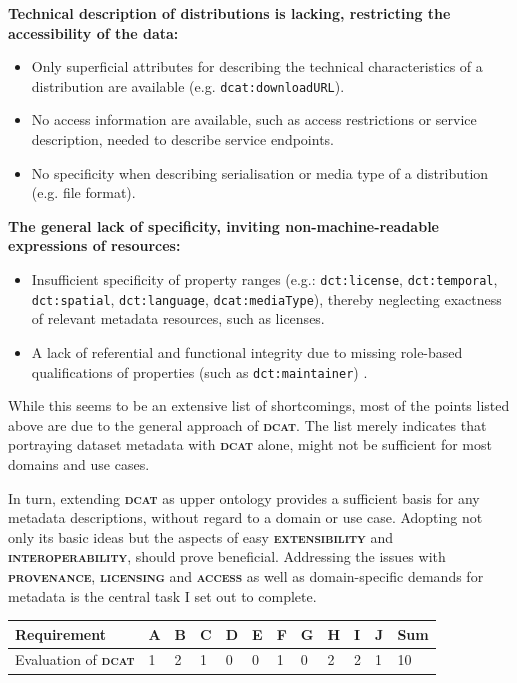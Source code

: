 \documentclass[a4paper,english,twoside,BCOR1.5cm,headsepline,DIV12,appendixprefix,final,12pt]{scrbook}
\newcommand{\provenance}{{\ttfamily\scshape\bfseries provenance}\xspace}
\newcommand{\licensing}{{\ttfamily\scshape\bfseries licensing}\xspace}
\newcommand{\access}{{\ttfamily\scshape\bfseries access}\xspace}
\newcommand{\extensibility}{{\ttfamily\scshape\bfseries extensibility}\xspace}
\newcommand{\interoperability}{{\ttfamily\scshape\bfseries interoperability}\xspace}
\newcommand{\dcat}{{\scshape\bfseries dcat}\xspace}
\newcommand{\prop}[1]{{{\texttt{#1}}}}
\begin{document}
\textbf{Technical description of distributions is lacking, restricting the accessibility of the data:}
\begin{itemize}
\item Only superficial attributes for describing the technical characteristics of a distribution are available (e.g. \prop{dcat:downloadURL}).
\item No access information are available, such as access restrictions or service description, needed to describe service endpoints.
\item No specificity when describing serialisation or media type of a distribution (e.g. file format).
\end{itemize}

\textbf{The general lack of specificity, inviting non-machine-readable expressions of resources:}
\begin{itemize}
\item Insufficient specificity of property ranges (e.g.: \prop{dct:license}, \prop{dct:temporal}, \prop{dct:spatial}, \prop{dct:language}, \prop{dcat:mediaType}), thereby neglecting exactness of relevant metadata resources, such as licenses.
\item A lack of referential and functional integrity due to missing role-based qualifications of properties (such as \prop{dct:maintainer}) \cite{jefferyCerifW3C2016}.
\end{itemize}

While this seems to be an extensive list of shortcomings, most of the points listed above are due to the general approach of \dcat. The list merely indicates that portraying dataset metadata with \dcat alone, might not be sufficient for most domains and use cases.

In turn, extending \dcat as upper ontology provides a sufficient basis for any metadata descriptions, without regard to a domain or use case. Adopting not only its basic ideas but the aspects of easy \extensibility and \interoperability, should prove beneficial. Addressing the issues with \provenance, \licensing and \access as well as domain-specific demands for metadata is the central task I set out to complete.

\begin{table}[!htbp]
    \centering
    \begin{tabular}{|l|l|l|l|l|l|l|l|l|l|l|l|}
        \hline
        Requirement & A & B & C & D & E & F & G & H & I & J & Sum \\
        \hline
        Evaluation of \dcat & 1 & 2 & 1 & 0 & 0 & 1 & 0 & 2 & 2 & 1 & 10 \\
        \hline
    \end{tabular}
    \label{tab:evaldcat}
\end{table}
\end{document}
